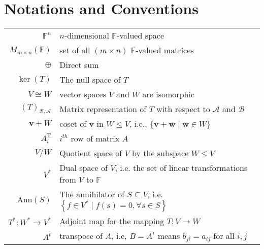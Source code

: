 \chapter*{Notations and Conventions}


\begin{tabular}{rl}
\({\mathbb{F}}^n\) & \(n\)-dimensional \(\mathbb{F}\)-valued space\\

 \({M}_{m \times  n}\left( \mathbb{F}\right)\) &set of all \((m \times  n)\) \(\mathbb{F}\)-valued matrices\\

 \(\oplus  \) & Direct sum \\

 \(\ker \left( T\right) \) & The null space of \(T\)\\

 \(V \cong  W\) & vector spaces \(V\) and \(W\) are isomorphic\\

 \({\left( T\right) }_{\mathcal{B},\mathcal{A}}\) & Matrix representation of \(T\) with respect to \(\mathcal{A}\) and \(\mathcal{B}\)\\

 \(\mathbf{v} + W\) & coset of \(\mathbf{v}\) in $W \leq V$, i.e., \(\{ \mathbf{v} + \mathbf{w} \mid  \mathbf{w} \in  W\}\)\\

 \({A}_{i}^{\mathrm{T}}\)& \(i^{th}\) row of matrix \(A\)\\

  \(V/W\) & Quotient space of \(V\) by the subspace \(W \leq V\)\\

  \(V^*\)& Dual space of \(V\), i.e. the set of linear transformations from \(V\) to \(\mathbb{F}\)\\

  \(\mathrm{Ann}\left( S\right) \) & The annihilator of \(S \subseteq  V\), i.e. \(\left\{  {f \in  {V}^{ * } \mid  f\left( s\right)  = 0,\forall s \in  S}\right\}\)\\

 \({T}^{ * } : {W}^{ * } \rightarrow  {V}^{ * }\) & Adjoint map  for the mapping \(T : V \rightarrow  W\)\\

\(A^t\) & transpose of \(A\), i.e, \(B = A^t\) means \({b}_{ji} = {{a}}_{ij}\) for all \(i,j\)\\


\end{tabular}
